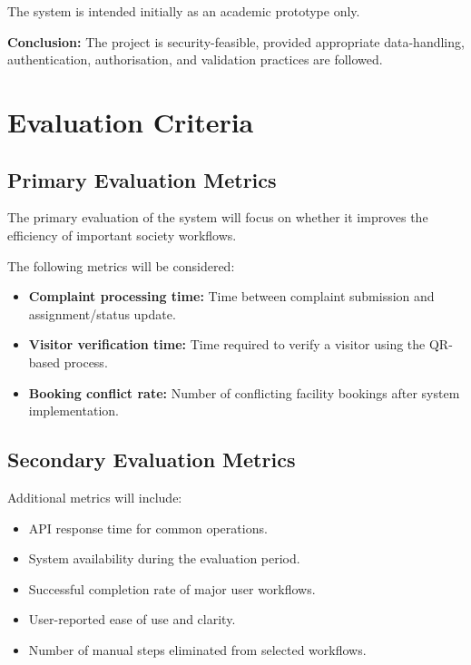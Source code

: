 \documentclass[11pt,a4paper]{article}
\begin{document}
The system is intended initially as an academic prototype only.

\textbf{Conclusion:} The project is security-feasible, provided appropriate data-handling, authentication, authorisation, and validation practices are followed.


\section{Evaluation Criteria}

\subsection{Primary Evaluation Metrics}

The primary evaluation of the system will focus on whether it improves the efficiency of important society workflows.

The following metrics will be considered:

\begin{itemize}

    \item \textbf{Complaint processing time:} Time between complaint submission and assignment/status update.

    \item \textbf{Visitor verification time:} Time required to verify a visitor using the QR-based process.

    \item \textbf{Booking conflict rate:} Number of conflicting facility bookings after system implementation.

\end{itemize}

\subsection{Secondary Evaluation Metrics}

Additional metrics will include:

\begin{itemize}

    \item API response time for common operations.

    \item System availability during the evaluation period.

    \item Successful completion rate of major user workflows.

    \item User-reported ease of use and clarity.

    \item Number of manual steps eliminated from selected workflows.

\end{itemize}
\end{document}
